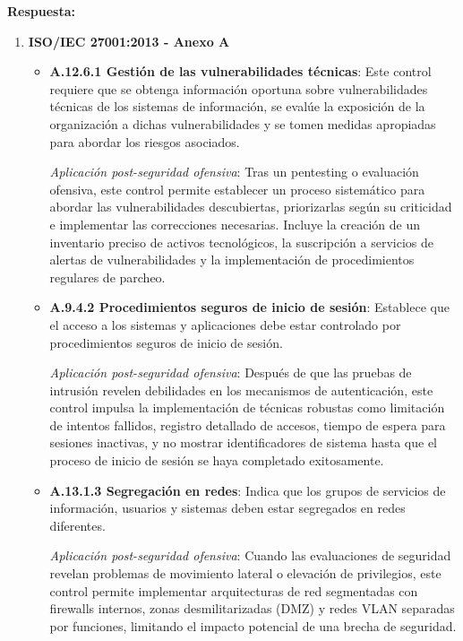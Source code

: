 {\textbf{Respuesta:}

\begin{enumerate}
    \item \textbf{ISO/IEC 27001:2013 - Anexo A}
    \begin{itemize}
        \item \textbf{A.12.6.1 Gestión de las vulnerabilidades técnicas}: Este control requiere que se obtenga información oportuna sobre vulnerabilidades técnicas de los sistemas de información, se evalúe la exposición de la organización a dichas vulnerabilidades y se tomen medidas apropiadas para abordar los riesgos asociados.
        
        \textit{Aplicación post-seguridad ofensiva}: Tras un pentesting o evaluación ofensiva, este control permite establecer un proceso sistemático para abordar las vulnerabilidades descubiertas, priorizarlas según su criticidad e implementar las correcciones necesarias. Incluye la creación de un inventario preciso de activos tecnológicos, la suscripción a servicios de alertas de vulnerabilidades y la implementación de procedimientos regulares de parcheo.
        
        \item \textbf{A.9.4.2 Procedimientos seguros de inicio de sesión}: Establece que el acceso a los sistemas y aplicaciones debe estar controlado por procedimientos seguros de inicio de sesión.
        
        \textit{Aplicación post-seguridad ofensiva}: Después de que las pruebas de intrusión revelen debilidades en los mecanismos de autenticación, este control impulsa la implementación de técnicas robustas como limitación de intentos fallidos, registro detallado de accesos, tiempo de espera para sesiones inactivas, y no mostrar identificadores de sistema hasta que el proceso de inicio de sesión se haya completado exitosamente.
        
        \item \textbf{A.13.1.3 Segregación en redes}: Indica que los grupos de servicios de información, usuarios y sistemas deben estar segregados en redes diferentes.
        
        \textit{Aplicación post-seguridad ofensiva}: Cuando las evaluaciones de seguridad revelan problemas de movimiento lateral o elevación de privilegios, este control permite implementar arquitecturas de red segmentadas con firewalls internos, zonas desmilitarizadas (DMZ) y redes VLAN separadas por funciones, limitando el impacto potencial de una brecha de seguridad.
    \end{itemize}


\end{enumerate}}
